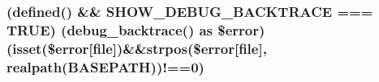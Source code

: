 \subsubsection[{(debug\+\_\+backtrace() as \$error)}]{({\bf defined}(\textquotesingle{}) \&\& {\bf S\+H\+O\+W\+\_\+\+D\+E\+B\+U\+G\+\_\+\+B\+A\+C\+K\+T\+R\+A\+C\+E} === T\+R\+U\+E) (debug\+\_\+backtrace() as \$error)(isset(\$error\mbox{[}\textquotesingle{}file\textquotesingle{}\mbox{]})\&\&strpos(\$error\mbox{[}\textquotesingle{}file\textquotesingle{}\mbox{]}, realpath({\bf B\+A\+S\+E\+P\+A\+T\+H}))!==0)}\label{_admin_2application_2views_2errors_2cli_2error__php_8php_acf0b45c2a78b2e3c8689c4cfbe34a63f}
